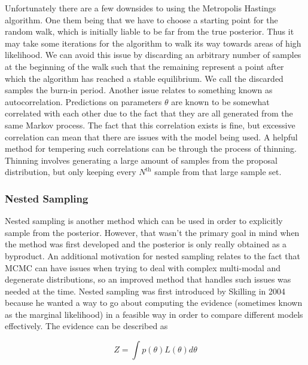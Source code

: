 %
%
Unfortunately there are a few downsides to using the Metropolis Hastings algorithm. One them being that we have to choose a starting point for the random walk, which is initially liable to be far from the true posterior. Thus it may take some iterations for the algorithm to walk its way towards areas of high likelihood. We can avoid this issue by discarding an arbitrary number of samples at the beginning of the walk such that the remaining represent a point after which the algorithm has reached a stable equilibrium. We call the discarded samples the burn-in period. Another issue relates to something known as autocorrelation. Predictions on parameters $\theta$ are known to be somewhat correlated with each other due to the fact that they are all generated from the same Markov process. The fact that this correlation exists is fine, but excessive correlation can mean that there are issues with the model being used. A helpful method for tempering such correlations can be through the process of thinning. Thinning involves generating a large amount of samples from the proposal distribution, but only keeping every $N^{\textrm{th}}$ sample from that large sample set. 

%
%

%
\subsubsection{Nested Sampling}

Nested sampling is another method which can be used in order to explicitly sample from the posterior. However, that wasn't the primary goal in mind when the method was first developed and the posterior is only really obtained as a byproduct. An additional motivation for nested sampling relates to the fact that \ac{MCMC} can have issues when trying to deal with complex multi-modal and degenerate distributions, so an improved method that handles such issues was needed at the time. Nested sampling was first introduced by Skilling in 2004 because he wanted a way to go about computing the evidence (sometimes known as the marginal likelihood) in a feasible way in order to compare different models effectively. The evidence can be described as

\begin{equation}
    Z = \int p(\theta) L(\theta) d\theta \label{eq:evidence}
\end{equation}


